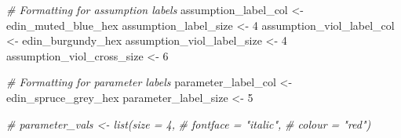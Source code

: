 \documentclass[
]{article}
\newenvironment{Shaded}{\begin{snugshade}}{\end{snugshade}}
\newcommand{\CommentTok}[1]{\textcolor[rgb]{0.56,0.35,0.01}{\textit{#1}}}
\newcommand{\DecValTok}[1]{\textcolor[rgb]{0.00,0.00,0.81}{#1}}
\newcommand{\NormalTok}[1]{#1}
\newcommand{\OtherTok}[1]{\textcolor[rgb]{0.56,0.35,0.01}{#1}}
\begin{document}
\begin{Shaded}
\begin{Highlighting}[]
\CommentTok{\# Formatting for assumption labels}
\NormalTok{assumption\_label\_col }\OtherTok{\textless{}{-}}\NormalTok{ edin\_muted\_blue\_hex}
\NormalTok{assumption\_label\_size }\OtherTok{\textless{}{-}} \DecValTok{4}
\NormalTok{assumption\_viol\_label\_col }\OtherTok{\textless{}{-}}\NormalTok{ edin\_burgundy\_hex}
\NormalTok{assumption\_viol\_label\_size }\OtherTok{\textless{}{-}} \DecValTok{4}
\NormalTok{assumption\_viol\_cross\_size }\OtherTok{\textless{}{-}} \DecValTok{6}

\CommentTok{\# Formatting for parameter labels}
\NormalTok{parameter\_label\_col }\OtherTok{\textless{}{-}}\NormalTok{ edin\_spruce\_grey\_hex}
\NormalTok{parameter\_label\_size }\OtherTok{\textless{}{-}} \DecValTok{5}

\CommentTok{\# parameter\_vals \textless{}{-} list(size = 4,}
\CommentTok{\#                        fontface = "italic", }
\CommentTok{\#                        colour = "red")}



\end{Highlighting}
\end{Shaded}
\end{document}
